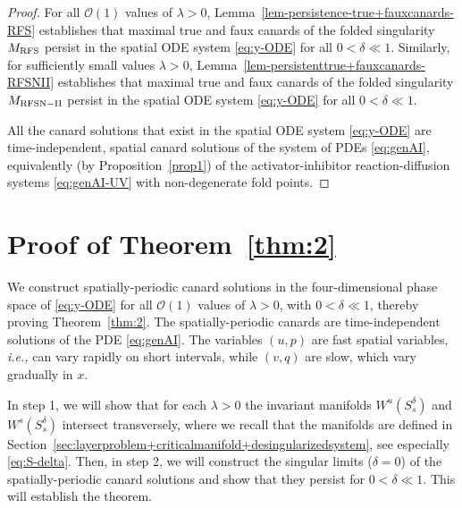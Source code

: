 \documentclass[11pt]{article}
\numberwithin{equation}{section}
\begin{document}
\medskip
\begin{proof} 
For all $\mathcal{O}(1)$ values of $\lambda> 0$, Lemma~\ref{lem-persistence-true+fauxcanards-RFS} establishes that maximal true and faux canards of the folded singularity $M_{\rm RFS}$ persist in the spatial ODE system \eqref{eq:y-ODE} for all $0 < \delta \ll 1$.
Similarly, for sufficiently small values $\lambda > 0$, Lemma~\ref{lem-persistenttrue+fauxcanards-RFSNII} establishes that maximal true and faux canards of the folded singularity $M_{\rm RFSN-II}$ persist in the spatial ODE system \eqref{eq:y-ODE} for all $0 < \delta \ll 1$.

All the canard solutions that exist in the spatial ODE system \eqref{eq:y-ODE} are time-independent, spatial canard solutions of the system of PDEs \eqref{eq:genAI}, equivalently (by Proposition~\ref{prop1}) of the activator-inhibitor reaction-diffusion systems \eqref{eq:genAI-UV} with non-degenerate fold points.
\end{proof} 


\section{Proof of Theorem~\texorpdfstring{\ref{thm:2}}{Lg}}\label{sec:proof-theorem2}

We construct spatially-periodic canard solutions in the four-dimensional phase space of \eqref{eq:y-ODE} for all $\mathcal{O}(1)$ values of $\lambda>0$, with $0<\delta \ll 1$, thereby proving Theorem~\ref{thm:2}.
The spatially-periodic canards are time-independent solutions of the PDE \eqref{eq:genAI}.
The variables $(u,p)$ are fast spatial variables, {\it i.e.,} can vary rapidly on short intervals, while $(v,q)$ are slow, which vary gradually in $x$.
 
In step 1, we will show that for each $\lambda>0$ the invariant manifolds $W^u(S_s^\delta)$ and $ W^s(S_s^\delta)$ intersect transversely, where we recall that the manifolds are defined in Section~\ref{sec:layerproblem+criticalmanifold+desingularizedsystem}, see especially \eqref{eq:S-delta}. 
Then, in step 2, we will construct the singular limits ($\delta=0$) of the spatially-periodic canard solutions and show that they persist for $0<\delta \ll 1$. This  will establish the theorem.
\end{document}
